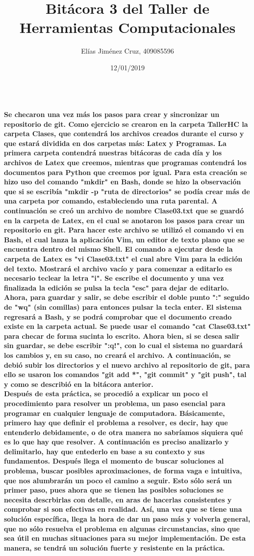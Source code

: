 \documentclass[letterpaper, 12pt, oneside]{article} %
\title{\Huge Bitácora 3 del Taller de Herramientas Computacionales}
\author{Elías Jiménez Cruz, 409085596}
\date{12/01/2019}
\begin{document}
	\maketitle
	\paragraph{\\Se checaron una vez más los pasos para crear y sincronizar un repositorio de git. Como ejercicio se crearon en la carpeta TallerHC la carpeta Clases, que contendrá los archivos creados durante el curso y que estará dividida en dos carpetas más: Latex y Programas. La primera carpeta contendrá nuestras bitácoras de cada día y los archivos de Latex que creemos, mientras que programas contendrá los documentos para Python que creemos por igual. Para esta creación se hizo uso del comando "mkdir" en Bash, donde se hizo la observación que si se escribía "mkdir -p "ruta de directorios" se podía crear más de una carpeta por comando, estableciendo una ruta parental. A continuación se creó un archivo de nombre Clase03.txt que se guardó en la carpeta de Latex, en el cual se anotaron los pasos para crear un repositorio en git. Para hacer este archivo se utilizó el comando vi en Bash, el cual lanza la aplicación Vim, un editor de texto plano que se encuentra dentro del mismo Shell. El comando a ejecutar desde la carpeta de Latex es "vi Clase03.txt" el cual abre Vim para la edición del texto. Mostrará el archivo vacío y para comenzar a editarlo es necesario teclear la letra "i". Se escribe el documento y una vez finalizada la edición se pulsa la tecla "esc" para dejar de editarlo. Ahora, para guardar y salir, se debe escribir el doble punto ":" seguido de "wq" (sin comillas) para entonces pulsar la tecla enter. El sistema regresará a Bash, y se podrá comprobar que el documento creado existe en la carpeta actual. Se puede usar el comando "cat Clase03.txt" para checar de forma sucinta lo escrito. Ahora bien, si se desea salir sin guardar, se debe escribir ":q!", con lo cual el sistema no guardará los cambios y, en su caso, no creará el archivo. A continuación, se debió subir los directorios y el nuevo archivo al repositorio de git, para ello se usaron los comandos "git add *", "git commit" y "git push", tal y como se describió en la bitácora anterior.\\Después de esta práctica, se procedió a explicar un poco el procedimiento para resolver un problema, un paso esencial para programar en cualquier lenguaje de computadora. Básicamente, primero hay que definir el problema a resolver, es decir, hay que entenderlo debidamente, o de otra manera no sabríamos siquiera qué es lo que hay que resolver. A continuación es preciso analizarlo y delimitarlo, hay que entederlo en base a su contexto y sus fundamentos. Después llega el momento de buscar soluciones al problema, buscar posibles aproximaciones, de forma vaga e intuitiva, que nos alumbrarán un poco el camino a seguir. Esto sólo será un primer paso, pues ahora que se tienen las posibles soluciones se necesita descrbirlas con detalle, en aras de hacerlas consistentes y comprobar si son efectivas en realidad. Así, una vez que se tiene una solución específica, llega la hora de dar un paso más y volverla general, que no sólo resuelva el problema en algunas circunstancias, sino que sea útil en muchas situaciones para su mejor implementación. De esta manera, se tendrá un solución fuerte y resistente en la práctica.}
\end{document}
